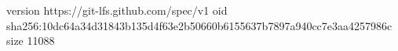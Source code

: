 version https://git-lfs.github.com/spec/v1
oid sha256:10dc64a34d31843b135d4f63e2b50660b6155637b7897a940cc7e3aa4257986c
size 11088
